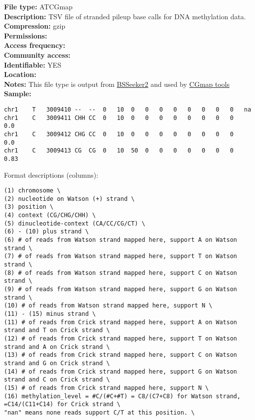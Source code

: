 \documentclass[
  11pt,
]{book}
\begin{document}
\textbf{File type:} ATCGmap\\
\textbf{Description:} TSV file of stranded pileup base calls for DNA methylation data.\\
\textbf{Compression:} gzip\\
\textbf{Permissions:}\\
\textbf{Access frequency:}\\
\textbf{Community access:}\\
\textbf{Identifiable:} YES\\
\textbf{Location:}\\
\textbf{Notes:} This file type is output from \href{https://github.com/BSSeeker/BSseeker2}{BSSeeker2} and used by \href{https://cgmaptools.github.io/}{CGmap tools}\\
\textbf{Sample:}

\begin{verbatim}
chr1    T   3009410 --  --  0   10  0   0   0   0   0   0   0   0   na
chr1    C   3009411 CHH CC  0   10  0   0   0   0   0   0   0   0   0.0
chr1    C   3009412 CHG CC  0   10  0   0   0   0   0   0   0   0   0.0
chr1    C   3009413 CG  CG  0   10  50  0   0   0   0   0   0   0   0.83
\end{verbatim}

Format descriptions (columns):

\begin{verbatim}
(1) chromosome \
(2) nucleotide on Watson (+) strand \
(3) position \
(4) context (CG/CHG/CHH) \
(5) dinucleotide-context (CA/CC/CG/CT) \
(6) - (10) plus strand \
(6) # of reads from Watson strand mapped here, support A on Watson strand \
(7) # of reads from Watson strand mapped here, support T on Watson strand \
(8) # of reads from Watson strand mapped here, support C on Watson strand \
(9) # of reads from Watson strand mapped here, support G on Watson strand \
(10) # of reads from Watson strand mapped here, support N \
(11) - (15) minus strand \
(11) # of reads from Crick strand mapped here, support A on Watson strand and T on Crick strand \
(12) # of reads from Crick strand mapped here, support T on Watson strand and A on Crick strand \
(13) # of reads from Crick strand mapped here, support C on Watson strand and G on Crick strand \
(14) # of reads from Crick strand mapped here, support G on Watson strand and C on Crick strand \
(15) # of reads from Crick strand mapped here, support N \
(16) methylation_level = #C/(#C+#T) = C8/(C7+C8) for Watson strand, =C14/(C11+C14) for Crick strand \
"nan" means none reads support C/T at this position. \
\end{verbatim}
\end{document}
